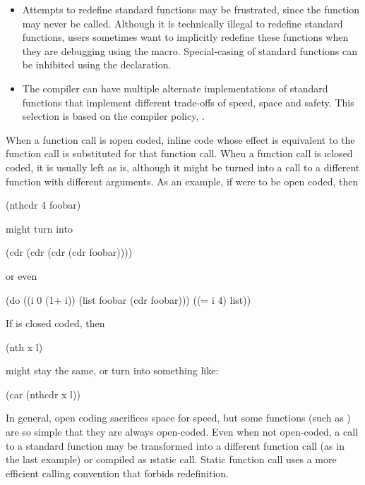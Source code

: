 {\begin{itemize}
\item
Attempts to redefine standard functions may be frustrated, since the function
may never be called.  Although it is technically illegal to redefine standard
functions, users sometimes want to implicitly redefine these functions when
they are debugging using the  macro.  Special-casing of standard
functions can be inhibited using the  declaration.

\item
The compiler can have multiple alternate implementations of standard functions
that implement different trade-offs of speed, space and safety.  This selection
is based on the compiler policy, .
\end{itemize}


When a function call is \i{open coded}, inline code whose effect is
equivalent to the function call is substituted for that function call.
When a function call is \i{closed coded}, it is usually left as is,
although it might be turned into a call to a different function with
different arguments.  As an example, if  were to be open
coded, then
\begin{lisp}
(nthcdr 4 foobar)
\end{lisp}
might turn into
\begin{lisp}
(cdr (cdr (cdr (cdr foobar))))
\end{lisp}
or even 
\begin{lisp}
(do ((i 0 (1+ i))
     (list foobar (cdr foobar)))
    ((= i 4) list))
\end{lisp}

If  is closed coded, then
\begin{lisp}
(nth x l)
\end{lisp}
might stay the same, or turn into something like:
\begin{lisp}
(car (nthcdr x l))
\end{lisp}

In general, open coding sacrifices space for speed, but some functions (such as
) are so simple that they are always open-coded.  Even when not
open-coded, a call to a standard function may be transformed into a different
function call (as in the last example) or compiled as \i{static call}.  Static
function call uses a more efficient calling convention that forbids
redefinition.




}

